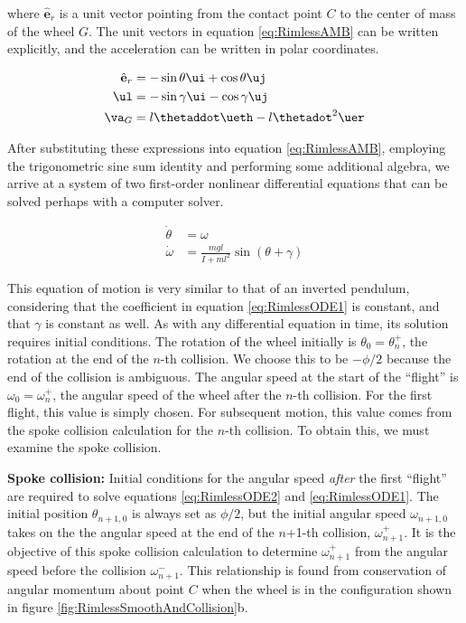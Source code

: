 where $\hat{\mathbf{e}}_{r}$ is a unit vector pointing from the contact point $C$ to the center of mass of the wheel $G$. The unit vectors in equation \ref{eq:RimlessAMB} can be written explicitly, and the acceleration can be written in polar coordinates.

\begin{align}
\hat{\mathbf{e}}_{r} &= - \sin{\theta} \ui + \cos{\theta} \uj \\
\ul &=  - \sin{\gamma} \ui - \cos{\gamma} \uj \\
\va_{G} &= l \thetaddot \ueth - l \thetadot^{2} \uer
\end{align}

After substituting these expressions into equation \ref{eq:RimlessAMB}, employing the trigonometric sine sum identity and performing some additional algebra, we arrive at a system of two first-order nonlinear differential equations that can be solved perhaps with a computer solver.

\begin{align}
\dot{\theta} &= \omega \label{eq:RimlessODE2} \\
\dot{\omega} &= \frac{mgl}{I + m l^2} \sin(\theta + \gamma) \label{eq:RimlessODE1}
\end{align}

This equation of motion is very similar to that of an inverted pendulum,
considering that the coefficient in equation \ref{eq:RimlessODE1} is constant,
and that $\gamma$ is constant as well. As with any differential equation in
time, its solution requires initial conditions. The rotation of the wheel
initially is $\theta_{0} = \theta_n^{+}$, the rotation at the end of the $n$-th
collision. We choose this to be $-\phi/2$ because the end of the collision is
ambiguous. The angular speed at the start of the ``flight'' is $\omega_{0} =
\omega_{n}^{+}$, the angular speed of the wheel after the $n$-th collision. For
the first flight, this value is simply chosen. For subsequent motion, this
value comes from the spoke collision calculation for the $n$-th collision. To
obtain this, we must examine the spoke collision.

\textbf{Spoke collision:} Initial conditions for the angular speed \emph{after} the first ``flight'' are required to solve equations \ref{eq:RimlessODE2} and \ref{eq:RimlessODE1}. The initial position $\theta_{n+1,0}$ is always set as $\phi/2$, but the initial angular speed $\omega_{n+1,0}$ takes on the the angular speed at the end of the $n$+1-th collision, $\omega_{n+1}^{+}$. It is the objective of this spoke collision calculation to determine $\omega_{n+1}^{+}$ from the angular speed before the collision $\omega_{n+1}^{-}$. This relationship is found from conservation of angular momentum about point $C$ when the wheel is in the configuration shown in figure \ref{fig:RimlessSmoothAndCollision}b.

